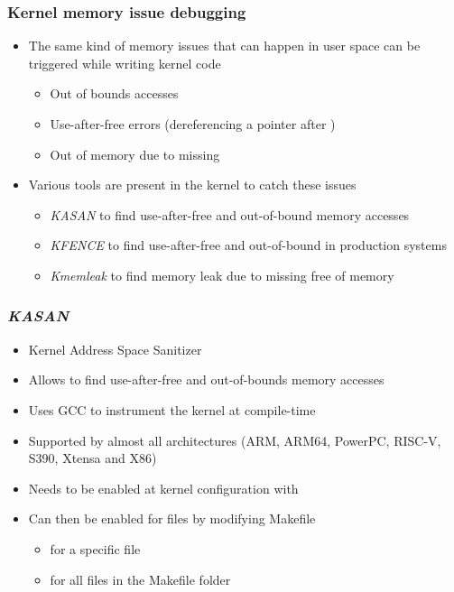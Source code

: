 \begin{frame}
  \frametitle{Kernel memory issue debugging}
  \begin{itemize}
    \item The same kind of memory issues that can happen in user space can be
          triggered while writing kernel code
    \begin{itemize}
      \item Out of bounds accesses
      \item Use-after-free errors (dereferencing a pointer after )
      \item Out of memory due to missing 
    \end{itemize}
    \item Various tools are present in the kernel to catch these issues
    \begin{itemize}
      \item {\em KASAN} to find use-after-free and out-of-bound memory accesses
      \item {\em KFENCE} to find use-after-free and out-of-bound in production systems
      \item {\em Kmemleak} to find memory leak due to missing free of memory
    \end{itemize}
  \end{itemize}
\end{frame}

\begin{frame}
  \frametitle{{\em KASAN}}
  \begin{itemize}
    \item Kernel Address Space Sanitizer
    \item Allows to find use-after-free and out-of-bounds memory accesses
    \item Uses GCC to instrument the kernel at compile-time
    \item Supported by almost all architectures (ARM, ARM64, PowerPC, RISC-V,
          S390, Xtensa and X86)
    \item Needs to be enabled at kernel configuration with
    \item Can then be enabled for files by modifying Makefile
    \begin{itemize}
      \item {} for a specific file
      \item {} for all files in the Makefile folder
    \end{itemize}
  \end{itemize}
\end{frame}

